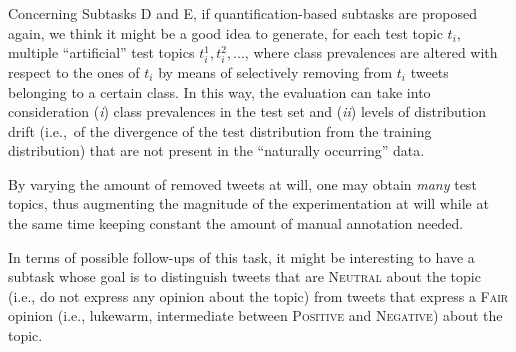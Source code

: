 \documentclass[11pt,letterpaper]{article}
\newif\ifdraft
\newcommand{\fabrizio}[1]{\ifdraft{\textcolor{cyan}{[Fabrizio]: {#1}}}\else{\vspace{0ex}}\fi}
\begin{document}
Concerning Subtasks D and E, if quantification-based subtasks are
proposed again, we think it might be a good idea to generate, for each
test topic $t_i$, multiple ``artificial'' test topics $t_i^1, t_i^2,
...$, where class prevalences are altered with respect to the ones of
$t_i$ by means of selectively removing from $t_i$ tweets belonging to
a certain class. In this way, the evaluation can take into
consideration (\emph{i}) class prevalences in the test set and
(\emph{ii}) levels of distribution drift (i.e.,~of the divergence of
the test distribution from the training distribution) that are not
present in the ``naturally occurring'' data. 

By varying the amount of
removed tweets at will, one may obtain \textit{many} test topics, thus
augmenting the magnitude of the experimentation at will while at the
same time keeping constant the amount of manual annotation needed.





In terms of possible follow-ups of this task, it might be interesting
to have a subtask whose goal is to distinguish tweets that are
\textsc{Neutral} about the topic (i.e., do not express any opinion
about the topic) from tweets that express a \textsc{Fair} opinion
(i.e., lukewarm, intermediate between \textsc{Positive} and
\textsc{Negative}) about the topic.
\end{document}
